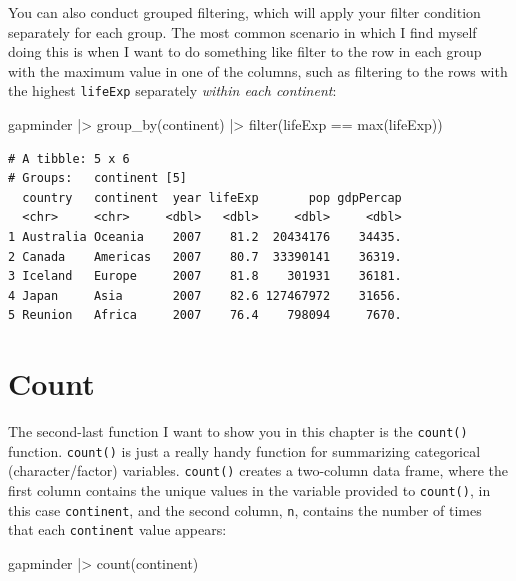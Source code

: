 \documentclass[
  letterpaper,
  DIV=11,
  numbers=noendperiod]{scrreprt}
\newenvironment{Shaded}{\begin{snugshade}}{\end{snugshade}}
\newcommand{\FunctionTok}[1]{\textcolor[rgb]{0.28,0.35,0.67}{#1}}
\newcommand{\NormalTok}[1]{\textcolor[rgb]{0.00,0.23,0.31}{#1}}
\newcommand{\SpecialCharTok}[1]{\textcolor[rgb]{0.37,0.37,0.37}{#1}}
\begin{document}
You can also conduct grouped filtering, which will apply your filter
condition separately for each group. The most common scenario in which I
find myself doing this is when I want to do something like filter to the
row in each group with the maximum value in one of the columns, such as
filtering to the rows with the highest \texttt{lifeExp} separately
\emph{within each continent}:

\begin{Shaded}
\begin{Highlighting}[]
\NormalTok{gapminder }\SpecialCharTok{|\textgreater{}}
  \FunctionTok{group\_by}\NormalTok{(continent) }\SpecialCharTok{|\textgreater{}}
  \FunctionTok{filter}\NormalTok{(lifeExp }\SpecialCharTok{==} \FunctionTok{max}\NormalTok{(lifeExp))}
\end{Highlighting}
\end{Shaded}

\begin{verbatim}
# A tibble: 5 x 6
# Groups:   continent [5]
  country   continent  year lifeExp       pop gdpPercap
  <chr>     <chr>     <dbl>   <dbl>     <dbl>     <dbl>
1 Australia Oceania    2007    81.2  20434176    34435.
2 Canada    Americas   2007    80.7  33390141    36319.
3 Iceland   Europe     2007    81.8    301931    36181.
4 Japan     Asia       2007    82.6 127467972    31656.
5 Reunion   Africa     2007    76.4    798094     7670.
\end{verbatim}

\section{Count}\label{count}

The second-last function I want to show you in this chapter is the
\texttt{count()} function. \texttt{count()} is just a really handy
function for summarizing categorical (character/factor) variables.
\texttt{count()} creates a two-column data frame, where the first column
contains the unique values in the variable provided to \texttt{count()},
in this case \texttt{continent}, and the second column, \texttt{n},
contains the number of times that each \texttt{continent} value appears:

\begin{Shaded}
\begin{Highlighting}[]
\NormalTok{gapminder }\SpecialCharTok{|\textgreater{}}
  \FunctionTok{count}\NormalTok{(continent)}
\end{Highlighting}
\end{Shaded}
\end{document}
